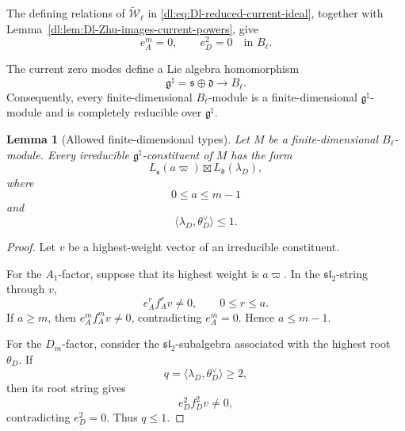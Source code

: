 \documentclass[11pt,reqno]{amsart}
\newtheorem{lemma}[theorem]{Lemma}
\theoremstyle{definition}
\theoremstyle{remark}
\begin{document}
The defining relations of
\(\widetilde{\mathcal W}_\ell\) in
\eqref{dl:eq:Dl-reduced-current-ideal}, together with
Lemma~\ref{dl:lem:Dl-Zhu-images-current-powers}, give
\begin{equation*}
  e_A^m=0,
  \qquad
  e_D^2=0
  \quad\text{in }B_\ell.
\end{equation*}

The current zero modes define a Lie algebra homomorphism
\begin{equation*}
  \mathfrak g^\natural
  =
  \mathfrak s\oplus\mathfrak d
  \longrightarrow B_\ell.
\end{equation*}
Consequently, every finite-dimensional \(B_\ell\)-module is a
finite-dimensional \(\mathfrak g^\natural\)-module and is completely
reducible over \(\mathfrak g^\natural\).

\begin{lemma}[Allowed finite-dimensional types]
\label{dl:lem:Dl-allowed-finite-types}
Let \(M\) be a finite-dimensional \(B_\ell\)-module.  Every irreducible
\(\mathfrak g^\natural\)-constituent of \(M\) has the form
\begin{equation*}
  L_{\mathfrak s}(a\varpi)
  \boxtimes
  L_{\mathfrak d}(\lambda_D),
\end{equation*}
where
\begin{equation*}
  0\le a\le m-1
\end{equation*}
and
\begin{equation}
  \langle\lambda_D,\theta_D^\vee\rangle\le1.
  \label{dl:eq:Dl-D-highest-root-level-bound}
\end{equation}
\end{lemma}

\begin{proof}
Let \(v\) be a highest-weight vector of an irreducible constituent.

For the \(A_1\)-factor, suppose that its highest weight is
\(a\varpi\).  In the \(\mathfrak{sl}_2\)-string through \(v\),
\begin{equation*}
  e_A^r f_A^r v\ne0,
  \qquad
  0\le r\le a.
\end{equation*}
If \(a\ge m\), then \(e_A^m f_A^m v\ne0\), contradicting
\(e_A^m=0\).  Hence \(a\le m-1\).

For the \(D_m\)-factor, consider the
\(\mathfrak{sl}_2\)-subalgebra associated with the highest root
\(\theta_D\).  If
\[
  q=\langle\lambda_D,\theta_D^\vee\rangle\ge2,
\]
then its root string gives
\begin{equation*}
  e_D^2f_D^2v\ne0,
\end{equation*}
contradicting \(e_D^2=0\).  Thus \(q\le1\).
\end{proof}
\end{document}
